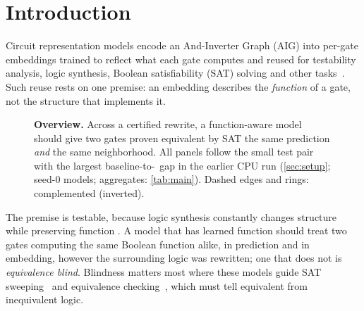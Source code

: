 \section{Introduction}
Circuit representation models encode an And-Inverter Graph (AIG) into per-gate embeddings trained to
reflect what each gate computes and reused for testability analysis, logic synthesis, Boolean
satisfiability (SAT) solving and other tasks~\cite{DBLP:conf/dac/0019KSWY022,DBLP:conf/iccad/ShiPKLLHZYCX23,DBLP:conf/iccad/ShiZKZ0024,DBLP:conf/iclr/ZhengHZSDX025,DBLP:conf/dac/WangBHZXHYH22,DBLP:conf/iccad/0006ZZLY024,DBLP:conf/dac/DengYYSCJZ24,DBLP:conf/dac/FangLLLZX25,DBLP:journals/trets/ZhaoGZWLJ26,DBLP:conf/iccad/ShiMZZPJYYCX25,DBLP:journals/corr/abs-2504-03711}.
Such reuse rests on one premise: an embedding describes the \emph{function} of a gate, not the structure
that implements it.

\begin{figure}[t]
\centering
\mainonly{\scalebox{0.872}{}}\extonly{}
\caption{\textbf{Overview.} Across a certified rewrite, a function-aware model should give two gates proven equivalent
by SAT the same prediction \emph{and} the same neighborhood. All panels follow the small test pair with the largest baseline-to-\ours\ gap in the earlier CPU run
(\cref{sec:setup}; seed-0 models; aggregates: \cref{tab:main}). Dashed edges and rings: complemented (inverted).}
\label{fig:overview}
\end{figure}

The premise is testable, because logic synthesis constantly changes structure while preserving function
\cite{DBLP:conf/dac/MishchenkoCB06,DBLP:conf/cav/BraytonM10}. A model that has learned function should treat two gates computing the same Boolean function
alike, in prediction and in embedding, however the surrounding logic was rewritten; one that does not is
\emph{equivalence blind}. Blindness matters most where these models guide SAT sweeping~\cite{DBLP:conf/iccad/ShiPKLLHZYCX23} and
equivalence checking~\cite{DBLP:journals/corr/abs-2508-04235}, which must tell equivalent from inequivalent logic.

